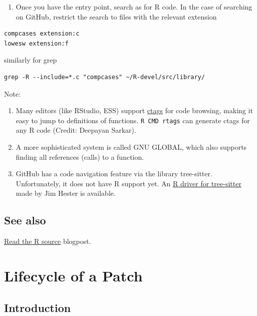 \documentclass[
]{book}
\providecommand{\tightlist}{%
  \setlength{\itemsep}{0pt}\setlength{\parskip}{0pt}}
\begin{document}
\begin{enumerate}
\def\labelenumi{\arabic{enumi}.}
\setcounter{enumi}{1}
\tightlist
\item
  Once you have the entry point, search as for R code. In the case of searching on GitHub, restrict the search to files with the relevant extension
\end{enumerate}

\begin{verbatim}
compcases extension:c
lowesw extension:f
\end{verbatim}

similarly for grep

\begin{verbatim}
grep -R --include=*.c "compcases" ~/R-devel/src/library/
\end{verbatim}

Note:

\begin{enumerate}
\def\labelenumi{\arabic{enumi}.}
\item
  Many editors (like RStudio, ESS) support \href{https://en.wikipedia.org/wiki/Ctags}{ctags} for code browsing, making it easy to jump to definitions of functions. \texttt{R\ CMD\ rtags} can generate ctags for any R code (Credit: Deepayan Sarkar).
\item
  A more sophisticated system is called GNU GLOBAL, which also supports
  finding all references (calls) to a function.
\item
  GitHub has a code navigation feature via the library tree-sitter. Unfortunately, it does not have R support yet. An \href{https://github.com/r-lib/tree-sitter-r}{R driver for tree-sitter} made by Jim Hester is available.
\end{enumerate}

\hypertarget{see-also-3}{%
\section{See also}\label{see-also-3}}

\href{https://blog.r-hub.io/2019/05/14/read-the-source/}{Read the R source} blogpost.

\hypertarget{FixBug}{%
\chapter{Lifecycle of a Patch}\label{FixBug}}

\hypertarget{introduction-1}{%
\section{Introduction}\label{introduction-1}}
\end{document}

